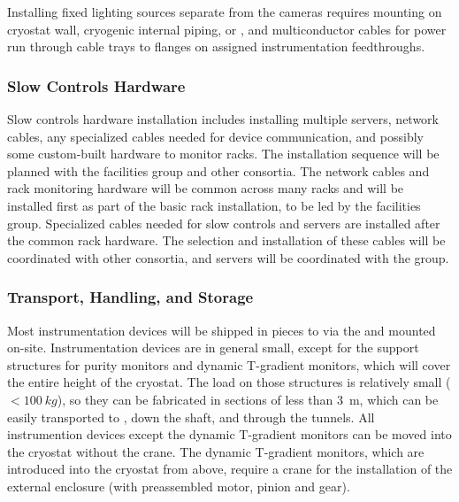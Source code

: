Installing fixed lighting sources separate from the cameras
requires mounting on cryostat wall, cryogenic internal piping, or
, and multiconductor cables for power run through cable
trays to flanges on assigned instrumentation feedthroughs.



\subsubsection{Slow Controls Hardware}
\label{sec:fdgen-slow-cryo-install-sc-hard}

Slow controls hardware installation %
includes installing multiple
servers, network cables, any specialized cables needed
for device communication, and possibly some custom-built hardware to monitor racks. The installation sequence will be 
planned with the facilities group and other consortia. The network
cables and rack monitoring hardware will be common across many racks
and will be installed first as part of the basic rack installation, %
to be led by the facilities group. Specialized cables needed for slow controls and servers %
are installed
after the common rack hardware. The selection and installation of these cables will be coordinated
with other consortia, and servers will be coordinated with the  group.

\subsubsection{Transport, Handling, and Storage}
\label{sec:fdgen-slow-cryo-install-transport}


Most instrumentation devices will be shipped in pieces to  via the  and mounted on-site. 
Instrumentation devices are in general small, except for  %
the support structures for purity monitors and dynamic T-gradient monitors,
which will cover the entire height of the cryostat. The load on those structures is relatively small (\(<\SI{100}{kg}\)), so they can be fabricated in sections of less than \SI{3}{m},
which can be easily transported to , down the shaft, and through the tunnels.
All instrumention devices except the dynamic T-gradient monitors can be moved into the cryostat without the crane. The dynamic T-gradient monitors, which %
are introduced into the cryostat from above, %
require a crane for the installation of the external enclosure (with preassembled motor, pinion and gear). %


